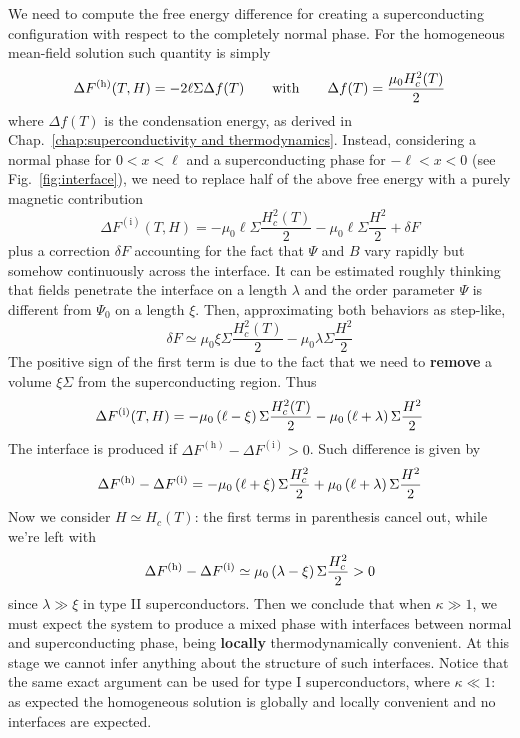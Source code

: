 We need to compute the free energy difference for creating a superconducting configuration with respect to the completely normal phase. For the homogeneous mean-field solution such quantity is simply
\[
    \Delta F^{(\mathrm{h})}(T,H) = - 2\ell\Sigma \Delta f(T)
    \quad\qq{with}\quad
    \Delta f(T) = \frac{\mu_0 H_c^2(T)}{2}
\]
where $\Delta f(T)$ is the condensation energy, as derived in Chap.~\ref{chap:superconductivity and thermodynamics}. Instead, considering a normal phase for $0<x<\ell$ and a superconducting phase for $-\ell<x<0$ (see Fig.~\ref{fig:interface}), we need to replace half of the above free energy with a purely magnetic contribution
\[
    \Delta F^{(\mathrm{i})}(T,H) = - \mu_0 \ell\Sigma \frac{H_c^2(T)}{2} - \mu_0 \ell\Sigma \frac{H^2}{2} + \delta F
\]
plus a correction $\delta F$ accounting for the fact that $\Psi$ and $B$ vary rapidly but somehow continuously across the interface. It can be estimated roughly thinking that fields penetrate the interface on a length $\lambda$ and the order parameter $\Psi$ is different from $\Psi_0$ on a length $\xi$. Then, approximating both behaviors as step-like,
\[
    \delta F \simeq \mu_0 \xi \Sigma \frac{H_c^2(T)}{2} - \mu_0 \lambda \Sigma \frac{H^2}{2}
\]
The positive sign of the first term is due to the fact that we need to \textbf{remove} a volume $\xi \Sigma$ from the superconducting region. Thus
\[
    \Delta F^{(\mathrm{i})}(T,H) = - \mu_0  \left({\ell-\xi}\right) \Sigma \frac{H_c^2(T)}{2} - \mu_0 \left({\ell+\lambda}\right) \Sigma \frac{H^2}{2}
\]
The interface is produced if $\Delta F^{(\mathrm{h})} - \Delta F^{(\mathrm{i})} > 0$. Such difference is given by
\[  
    \Delta F^{(\mathrm{h})} - \Delta F^{(\mathrm{i})} = -\mu_0  \left({\ell+\xi}\right) \Sigma \frac{H_c^2}{2} + \mu_0 \left({\ell+\lambda}\right) \Sigma \frac{H^2}{2}
\]
Now we consider $H\simeq H_c(T)$: the first terms in parenthesis cancel out, while we're left with
\[
    \Delta F^{(\mathrm{h})} - \Delta F^{(\mathrm{i})} \simeq \mu_0 \left({\lambda-\xi}\right) \Sigma \frac{H_c^2}{2} > 0
\]
since $\lambda \gg \xi$ in type II superconductors. Then we conclude that when $\kappa \gg 1$, we must expect the system to produce a mixed phase with interfaces between normal and superconducting phase, being \textbf{locally} thermodynamically convenient. At this stage we cannot infer anything about the structure of such interfaces.
Notice that the same exact argument can be used for type I superconductors, where $\kappa\ll1$: as expected the homogeneous solution is globally and locally convenient and no interfaces are expected.

